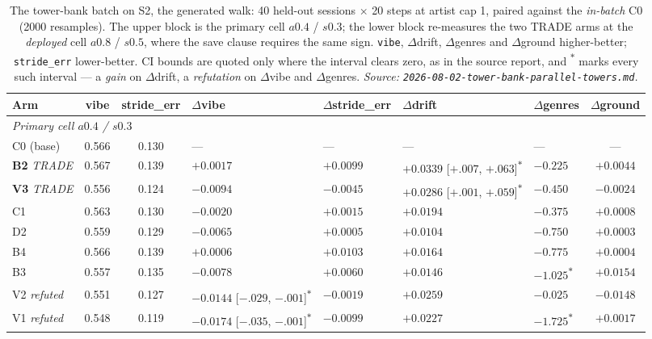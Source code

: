 \documentclass[11pt]{article}
\begin{document}
\begin{table}[ht]
  \centering
  \caption{The tower-bank batch on S2, the generated walk: \num{40} held-out
  sessions $\times$ \num{20} steps at artist cap 1, paired against the
  \emph{in-batch} C0 (\num{2000} resamples). The upper block is the primary cell
  $a\num{0.4}$ / $s\num{0.3}$; the lower block re-measures the two TRADE arms at
  the \emph{deployed} cell $a\num{0.8}$ / $s\num{0.5}$, where the save clause
  requires the same sign. \texttt{vibe}, $\Delta$drift, $\Delta$genres and
  $\Delta$ground higher-better; \texttt{stride\_err} lower-better. CI bounds are
  quoted only where the interval clears zero, as in the source report, and
  \textsuperscript{$\ast$} marks every such interval --- a \emph{gain} on
  $\Delta$drift, a \emph{refutation} on $\Delta$vibe and $\Delta$genres.
  \emph{Source: \texttt{2026-08-02-tower-bank-parallel-towers.md}.}}
  \label{tab:towerbank-s2}
  {\scriptsize\setlength{\tabcolsep}{2.6pt}\begin{tabular}{lccllllc}
    \toprule
    Arm & vibe & stride\_err & $\Delta$vibe & $\Delta$stride\_err & $\Delta$drift & $\Delta$genres & $\Delta$ground \\
    \midrule
    \multicolumn{8}{l}{\emph{Primary cell $a\num{0.4}$ / $s\num{0.3}$}} \\
    C0 (base) & 0.566 & 0.130 & --- & --- & --- & --- & --- \\
    \textbf{B2} \emph{TRADE} & 0.567 & 0.139 & $+0.0017$ & $+0.0099$ & $\mathbf{+0.0339}$ [$+.007$, $+.063$]\textsuperscript{$\ast$} & $-0.225$ & $+0.0044$ \\
    \textbf{V3} \emph{TRADE} & 0.556 & 0.124 & $-0.0094$ & $-0.0045$ & $\mathbf{+0.0286}$ [$+.001$, $+.059$]\textsuperscript{$\ast$} & $-0.450$ & $-0.0024$ \\
    C1 & 0.563 & 0.130 & $-0.0020$ & $+0.0015$ & $+0.0194$ & $-0.375$ & $+0.0008$ \\
    D2 & 0.559 & 0.129 & $-0.0065$ & $+0.0005$ & $+0.0104$ & $-0.750$ & $+0.0003$ \\
    B4 & 0.566 & 0.139 & $+0.0006$ & $+0.0103$ & $+0.0164$ & $-0.775$ & $+0.0004$ \\
    B3 & 0.557 & 0.135 & $-0.0078$ & $+0.0060$ & $+0.0146$ & $\mathbf{-1.025}$\textsuperscript{$\ast$} & $+0.0154$ \\
    V2 \emph{refuted} & 0.551 & 0.127 & $\mathbf{-0.0144}$ [$-.029$, $-.001$]\textsuperscript{$\ast$} & $-0.0019$ & $+0.0259$ & $-0.025$ & $-0.0148$ \\
    V1 \emph{refuted} & 0.548 & 0.119 & $\mathbf{-0.0174}$ [$-.035$, $-.001$]\textsuperscript{$\ast$} & $-0.0099$ & $+0.0227$ & $\mathbf{-1.725}$\textsuperscript{$\ast$} & $+0.0017$ \\

\end{tabular}}
\end{table}
\end{document}
